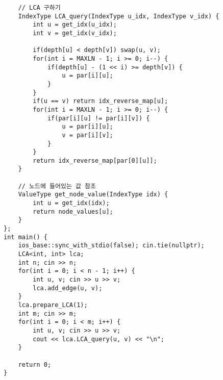 \documentclass[landscape, 8pt, a4paper, oneside, twocolumn]{extarticle}
\begin{document}
\begin{verbatim}
    // LCA 구하기
    IndexType LCA_query(IndexType u_idx, IndexType v_idx) {
        int u = get_idx(u_idx);
        int v = get_idx(v_idx);

        if(depth[u] < depth[v]) swap(u, v);
        for(int i = MAXLN - 1; i >= 0; i--) {
            if(depth[u] - (1 << i) >= depth[v]) {
                u = par[i][u];
            }
        }
        if(u == v) return idx_reverse_map[u];
        for(int i = MAXLN - 1; i >= 0; i--) {
            if(par[i][u] != par[i][v]) {
                u = par[i][u];
                v = par[i][v];
            }
        }
        return idx_reverse_map[par[0][u]];
    }

    // 노드에 들어있는 값 참조
    ValueType get_node_value(IndexType idx) {
        int u = get_idx(idx);
        return node_values[u];
    }
};
int main() {
    ios_base::sync_with_stdio(false); cin.tie(nullptr);
    LCA<int, int> lca;
    int n; cin >> n;
    for(int i = 0; i < n - 1; i++) {
        int u, v; cin >> u >> v;
        lca.add_edge(u, v);
    }
    lca.prepare_LCA(1);
    int m; cin >> m;
    for(int i = 0; i < m; i++) {
        int u, v; cin >> u >> v;
        cout << lca.LCA_query(u, v) << "\n";
    }

    return 0;
}
    \end{verbatim}
\end{document}
